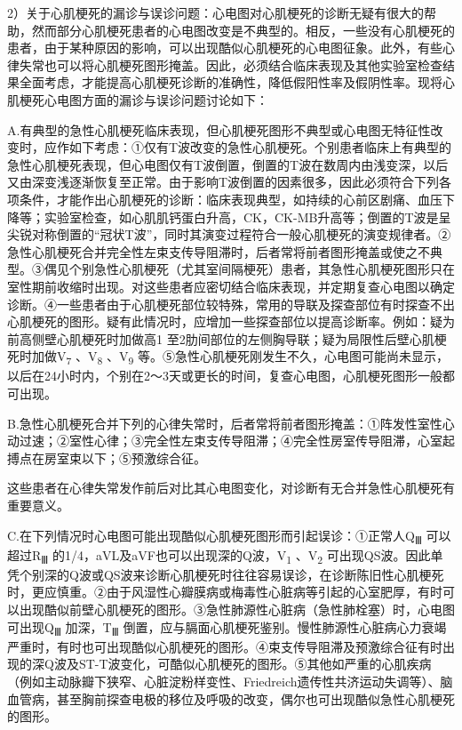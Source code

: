 2）关于心肌梗死的漏诊与误诊问题：心电图对心肌梗死的诊断无疑有很大的帮助，然而部分心肌梗死患者的心电图改变是不典型的。相反，一些没有心肌梗死的患者，由于某种原因的影响，可以出现酷似心肌梗死的心电图征象。此外，有些心律失常也可以将心肌梗死图形掩盖。因此，必须结合临床表现及其他实验室检查结果全面考虑，才能提高心肌梗死诊断的准确性，降低假阳性率及假阴性率。现将心肌梗死心电图方面的漏诊与误诊问题讨论如下：

A.有典型的急性心肌梗死临床表现，但心肌梗死图形不典型或心电图无特征性改变时，应作如下考虑：①仅有T波改变的急性心肌梗死。个别患者临床上有典型的急性心肌梗死表现，但心电图仅有T波倒置，倒置的T波在数周内由浅变深，以后又由深变浅逐渐恢复至正常。由于影响T波倒置的因素很多，因此必须符合下列各项条件，才能作出心肌梗死的诊断：临床表现典型，如持续的心前区剧痛、血压下降等；实验室检查，如心肌肌钙蛋白升高，CK，CK-MB升高等；倒置的T波是呈尖锐对称倒置的“冠状T波”，同时其演变过程符合一般心肌梗死的演变规律者。②急性心肌梗死合并完全性左束支传导阻滞时，后者常将前者图形掩盖或使之不典型。③偶见个别急性心肌梗死（尤其室间隔梗死）患者，其急性心肌梗死图形只在室性期前收缩时出现。对这些患者应密切结合临床表现，并定期复查心电图以确定诊断。④一些患者由于心肌梗死部位较特殊，常用的导联及探查部位有时探查不出心肌梗死的图形。疑有此情况时，应增加一些探查部位以提高诊断率。例如：疑为前高侧壁心肌梗死时加做高1
至2肋间部位的左侧胸导联；疑为局限性后壁心肌梗死时加做V\textsubscript{7}
、V\textsubscript{8} 、V\textsubscript{9}
等。⑤急性心肌梗死刚发生不久，心电图可能尚未显示，以后在24小时内，个别在2～3天或更长的时间，复查心电图，心肌梗死图形一般都可出现。

B.急性心肌梗死合并下列的心律失常时，后者常将前者图形掩盖：①阵发性室性心动过速；②室性心律；③完全性左束支传导阻滞；④完全性房室传导阻滞，心室起搏点在房室束以下；⑤预激综合征。

这些患者在心律失常发作前后对比其心电图变化，对诊断有无合并急性心肌梗死有重要意义。

C.在下列情况时心电图可能出现酷似心肌梗死图形而引起误诊：①正常人Q\textsubscript{Ⅲ}
可以超过R\textsubscript{Ⅲ}
的1/4，aVL及aVF也可以出现深的Q波，V\textsubscript{1}
、V\textsubscript{2}
可出现QS波。因此单凭个别深的Q波或QS波来诊断心肌梗死时往往容易误诊，在诊断陈旧性心肌梗死时，更应慎重。②由于风湿性心瓣膜病或梅毒性心脏病等引起的心室肥厚，有时可以出现酷似前壁心肌梗死的图形。③急性肺源性心脏病（急性肺栓塞）时，心电图可出现Q\textsubscript{Ⅲ}
加深，T\textsubscript{Ⅲ}
倒置，应与膈面心肌梗死鉴别。慢性肺源性心脏病心力衰竭严重时，有时也可出现酷似心肌梗死的图形。④束支传导阻滞及预激综合征有时出现的深Q波及ST-T波变化，可酷似心肌梗死的图形。⑤其他如严重的心肌疾病（例如主动脉瓣下狭窄、心脏淀粉样变性、Friedreich遗传性共济运动失调等）、脑血管病，甚至胸前探查电极的移位及呼吸的改变，偶尔也可出现酷似急性心肌梗死的图形。

